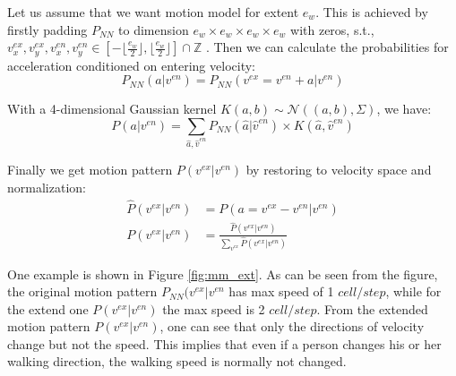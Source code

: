 Let us assume that we want motion model for extent $e_w$. This is achieved by firstly padding $P_{NN}$ to dimension $e_w \times e_w \times e_w \times e_w$ with zeros, s.t., $v^{ex}_x, v^{ex}_y,v^{en}_x, v^{en}_y \in [-\lfloor \frac{e_w}{2} \rfloor, \lfloor \frac{e_w}{2} \rfloor] \cap \mathbb{Z}$ . Then we can calculate the probabilities for acceleration conditioned on entering velocity:
\begin{equation}
P_{NN}(a|v^{en}) = P_{NN}(v^{ex}=v^{en}+a|v^{en}) \label{eq:mm_2}
\end{equation}

With a 4-dimensional Gaussian kernel $K(a, b) \sim \mathcal{N}((a,b), \Sigma)$, we have:
\begin{equation}
P(a|v^{en}) = \sum_{\hat{a}, \hat{v}^{en}}P_{NN}(\hat{a}|\hat{v}^{en})\times K(\hat{a}, \hat{v}^{en}) \label{eq:mm_3} 
\end{equation}

Finally we get motion pattern $P(v^{ex}|v^{en})$ by restoring to velocity space and normalization:
\begin{align}
\hat{P}(v^{ex}|v^{en}) &= P(a=v^{ex}-v^{en}|v^{en}) \\
P(v^{ex}|v^{en}) &= \frac{\hat{P}(v^{ex}|v^{en})}{\sum_{v^{ex}}\hat{P}(v^{ex}|v^{en})} \label{eq:mm_4}
\end{align}

One example is shown in Figure \ref{fig:mm_ext}. As can be seen from the figure, the original motion pattern $P_{NN}(v^{ex}|v^{en}$ has max speed of 1 $cell/step$, while for the extend one $P(v^{ex}|v^{en})$ the max speed is 2 $cell/step$. From the extended motion pattern $P(v^{ex}|v^{en})$, one can see that only the directions of velocity change but not the speed. This implies that even if a person changes his or her walking direction, the walking speed is normally not changed.

